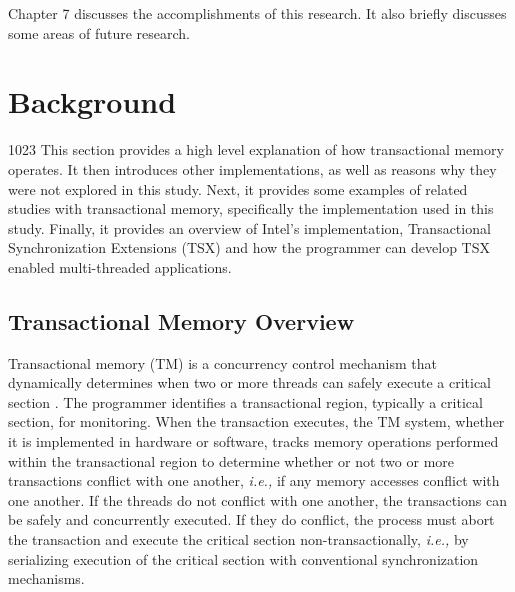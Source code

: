 \documentclass[11pt]{book}
\begin{document}
Chapter 7 discusses the accomplishments of this research.  It also briefly discusses some
areas of future research.


\chapter{Background}

 1023
This section provides a high level explanation of how transactional memory operates.  It
then introduces other implementations, as well as reasons why they were not explored in
this study.  Next, it provides some examples of related studies with transactional memory,
specifically the implementation used in this study.  Finally, it provides an overview of
Intel's implementation, Transactional Synchronization Extensions (TSX) and how the
programmer can develop TSX enabled multi-threaded applications.

\section{Transactional Memory Overview}

Transactional memory (TM) is a concurrency control mechanism that dynamically determines
when two or more threads can safely execute a critical section \cite{sle_rajwar}.  The
programmer identifies a transactional region, typically a critical section, for
monitoring.  When the transaction executes, the TM system, whether it is implemented in
hardware or software, tracks memory operations performed within the transactional region
to determine whether or not two or more transactions conflict with one another,
\emph{i.e.,} if any memory accesses conflict with one another.  If the threads do not
conflict with one another, the transactions can be safely and concurrently executed.  If
they do conflict, the process must abort the transaction and execute the critical section
non-transactionally, \emph{i.e.,} by serializing execution of the critical section with
conventional synchronization mechanisms.

\end{document}
